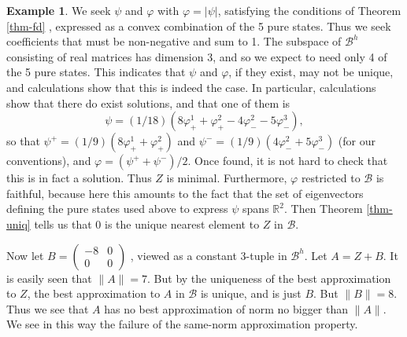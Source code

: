 \documentclass[12pt]{amsart}
\newcommand{\<}{\langle}
\renewcommand{\>}{\rangle}
\newcommand{\var}{\varphi}
\newcommand{\cB}{{\mathcal B}}
\newcommand{\cBH}{{\mathcal B}^h}
\newcommand{\bR}{{\mathbb R}}
\theoremstyle{definition}   %
\newtheorem{example}[theorem]{Example}
\begin{document}
\begin{example}
We seek $\psi$ and $\var$ with $\var = |\psi|$, satisfying the conditions
of Theorem \ref{thm-fd}  , expressed as a convex combination of the 5
pure states. Thus we seek coefficients that must be non-negative and sum to
1. The subspace of $\cBH$ consisting of real matrices has dimension 3,
and so we expect to need only 4 of the 5 pure states. This indicates
that $\psi$ and $\var$, if they exist, may not be unique, and calculations
show that this is indeed the case. In particular, calculations show that 
there do exist solutions, and that one of them is
\[
\psi = (1/18)(8\var^1_+ + \var^2_+ - 4 \var^2_- - 5\var^3_-)  ,
\]
so that $\psi^+ = (1/9)(8\var^1_+ + \var^2_+)$ and
$\psi^- = (1/9)(4 \var^2_- + 5\var^3_-)$  (for our conventions),
and $\var = (\psi^+ + \psi^-)/2$.
Once found, it is not hard to check that this is in fact a solution.
Thus $Z$ is minimal. Furthermore, $\var$ 
restricted to $\cB$ is faithful, because here this amounts to the
fact that the set of eigenvectors defining the pure states used above
to express $\psi$ spans $\bR^2$.  Then Theorem \ref{thm-uniq}
tells us that 0 is the unique nearest element
to $Z$ in $\cB$.

Now let $B =  \begin{pmatrix}   -8 & 0  \\                                              
                                         0 & 0             \end{pmatrix} $ , viewed
                                         as a constant 3-tuple in $\cBH$. Let $A = Z + B$.
It is easily seen that $\|A\| = 7$. But by the uniqueness of the
best approximation to $Z$, the best approximation to $A$ in $\cB$ is
unique, and is just $B$. But $\|B\| = 8$. Thus we see that $A$ has
no best approximation of norm no bigger than $\|A\|$. We see in
this way the failure of the same-norm approximation property.                                        
\end{example}                                   
                                        
% 
%
                                        
                                        



\end{document}
